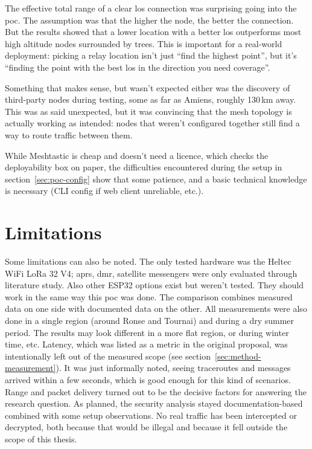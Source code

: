 The effective total range of a clear \gls{los} connection was surprising going into the \gls{poc}. The assumption was that the higher the node, the better the connection. But the results showed that a lower location with a better \gls{los} outperforms most high altitude nodes surrounded by trees.
This is important for a real-world deployment: picking a relay location isn't just ``find the highest point'', but it's ``finding the point with the best \gls{los} in the direction you need coverage''.

Something that makes sense, but wasn't expected either was the discovery of third-party nodes during testing, some as far as Amiens, roughly 130\,km away.
This was as said unexpected, but it was convincing that the mesh topology is actually working as intended: nodes that weren't configured together still find a way to route traffic between them.

While Meshtastic is cheap and doesn't need a licence, which checks the deployability box on paper, the difficulties encountered during the setup in section~\ref{sec:poc-config} show that some patience, and a basic technical knowledge is necessary (CLI config if web client unreliable, etc.).

\section{Limitations}%
\label{sec:conclusion-limitations}

Some limitations can also be noted. The only tested hardware was the Heltec WiFi LoRa 32 V4; \gls{aprs}, \gls{dmr}, satellite messengers were only evaluated through literature study. Also other ESP32 options exist but weren't tested. They should work in the same way this \gls{poc} was done.
The comparison combines measured data on one side with documented data on the other. All measurements were also done in a single region (around Ronse and Tournai) and during a dry summer period. The results may look different in a more flat region, or during winter time, etc.
Latency, which was listed as a metric in the original proposal, was intentionally left out of the measured scope (see section~\ref{sec:method-measurement}). It was just informally noted, seeing traceroutes and messages arrived within a few seconds, which is good enough for this kind of scenarios.
Range and packet delivery turned out to be the decisive factors for answering the research question.
As planned, the security analysis stayed documentation-based combined with some setup observations. No real traffic has been intercepted or decrypted, both because that would be illegal and because it fell outside the scope of this thesis.

